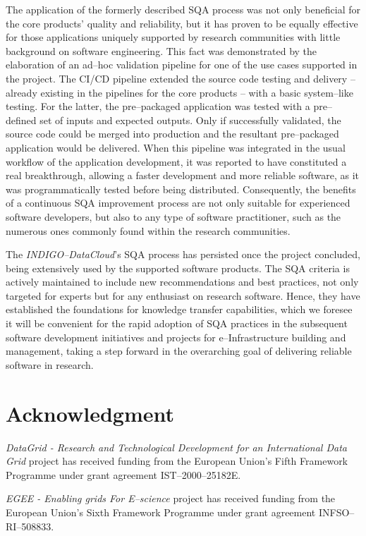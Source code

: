 The application of the formerly described SQA process was not only beneficial for the
core products' quality and reliability, but it has proven to be equally effective for
those applications uniquely supported by research communities with little background 
on software engineering. This fact was demonstrated by the elaboration of an ad--hoc validation pipeline for one
of the use cases supported in the project. The CI/CD pipeline extended the source code testing and delivery
-- already existing in the pipelines for the core products -- with a basic system--like testing. 
For the latter, the
pre--packaged application was tested with a pre--defined set of inputs and expected
outputs. Only if successfully validated, the source code could be merged into production 
and the resultant pre--packaged application would be delivered. When this pipeline was
integrated in the usual workflow of the application development, it was reported to have constituted a real 
breakthrough, allowing a faster development and more reliable software, as it was programmatically tested
before being distributed. Consequently, the 
benefits of a continuous SQA improvement process are not only suitable for experienced
software developers, but also to any type of software practitioner, such as the numerous ones
commonly found within the research communities.

The {\sl INDIGO--DataCloud}'s SQA process has persisted once the project concluded, being 
extensively used by the supported software products. The SQA criteria is actively
maintained to include new recommendations and best practices, not only targeted for
experts but for any enthusiast on research software. Hence, they have established the foundations for 
knowledge transfer capabilities, which we foresee it will be convenient for the rapid adoption of 
SQA practices in the subsequent software development initiatives and projects for e--Infrastructure 
building and management, taking a step forward in the overarching goal
of delivering reliable software in research.


\section*{Acknowledgment}

{\sl DataGrid - Research and Technological Development for an International Data Grid}
project has received funding from the European Union's Fifth Framework Programme under
grant agreement IST--2000--25182E.

{\sl EGEE - Enabling grids For E--science} project has received funding from the European
Union's Sixth Framework Programme under grant agreement INFSO--RI--508833.

